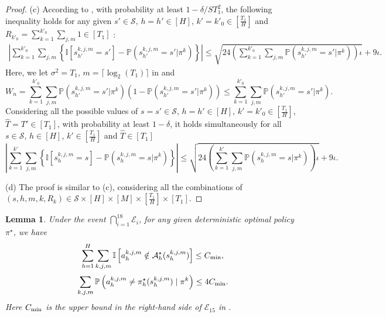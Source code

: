 \documentclass{article}
\newtheorem{lemma}{Lemma}[section]
\begin{document}
\begin{proof}
    (c) According to , with probability at least $1- \delta/ST_1^2$, the following inequality holds for any given $s' \in \mathcal{S}$, $h = h' \in [H]$, $k' = k'_0 \in [\frac{T_1}{H}]$ and $R_{k'_0} = \sum_{k = 1}^{k'_0} \sum_{j,m} 1 \in [T_1]$ :
    \begin{align*}
        \left|\sum_{k = 1}^{k'_0} \sum_{j,m}\left\{\mathbb{I}\left[s_{h'}^{k,j,m} = s'\right] - \mathbb{P}\left(s_{h'}^{k,j,m} = s' | \pi^k\right)\right\}\right| \leq \sqrt{24\left(\sum_{k = 1}^{k'_0} \sum_{j,m}\mathbb{P}\left(s_{h'}^{k,j,m} = s' | \pi^k\right)\right)\iota} + 9\iota.
    \end{align*}
    Here, we let $\sigma^2 = T_1$, $m = \lceil\log_2(T_1)\rceil$ in  and 
    $$W_n = \sum_{k = 1}^{k'_0} \sum_{j,m}\mathbb{P}\left(s_{h'}^{k,j,m} = s' | \pi^k\right)\left(1-\mathbb{P}\left(s_{h'}^{k,j,m} = s' | \pi^k\right)\right) \leq \sum_{k = 1}^{k'_0} \sum_{j,m}\mathbb{P}\left(s_{h'}^{k,j,m} = s' | \pi^k\right).$$
    Considering all the possible values of $s =s' \in \mathcal{S}$, $h = h' \in [H]$, $k' = k'_0 \in [\frac{T_1}{H}]$, $\hat{T} = T' \in [T_1]$, with probability at least $1-\delta$, it holds simultaneously for all $s \in \mathcal{S}$, $h \in [H]$, $k' \in [\frac{T_1}{H}]$ and $\hat{T} \in [T_1]$
    $$\left|\sum_{k = 1}^{k'} \sum_{j,m}\left\{\mathbb{I}\left[s_{h}^{k,j,m} = s\right] - \mathbb{P}\left(s_{h}^{k,j,m} = s | \pi^k\right)\right\}\right| \leq \sqrt{24\left(\sum_{k = 1}^{k'} \sum_{j,m}\mathbb{P}\left(s_{h}^{k,j,m} = s | \pi^k\right)\right)\iota} + 9\iota.$$

    (d) The proof is similar to (c), considering all the combinations of $(s,h,m,k,R_k) \in \mathcal{S} \times [H] \times[M] \times[\frac{T_1}{H}] \times [T_1]$. 
\end{proof}
\begin{lemma}
\label{nonoptimalpolicy}
Under the event $\bigcap_{i=1}^{18}\mathcal{E}_i$, for any given deterministic optimal policy $\pi^{\star}$, we have 
    \begin{equation*}
        \sum_{h=1}^H\sum_{k,j,m}\mathbb{I}\left[a_h^{k,j,m} \notin \mathcal{A}_h^{\star}(s_h^{k,j,m})\right] \leq  C_{\textnormal{min}},      
    \end{equation*}
    \begin{equation*}
        \sum_{k,j,m}\mathbb{P}\left(a_h^{k,j,m} \neq \pi_h^{\star}(s_h^{k,j,m}) \mid \pi^k\right) \leq  4C_{\textnormal{min}} .
    \end{equation*}
    Here  $C_{\textnormal{min}}$ is the upper bound in the right-hand side of $\mathcal{E}_{15}$ in  .
\end{lemma}
\end{document}
